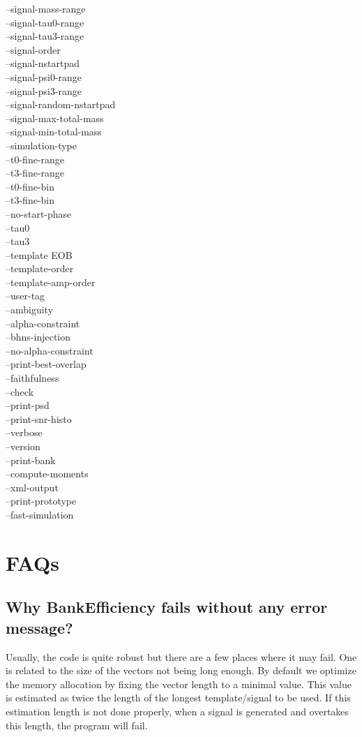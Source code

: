 \documentclass[a4paper,10pt]{article}
\begin{document}
--signal-mass-range\\
--signal-tau0-range\\
--signal-tau3-range\\
--signal-order\\
--signal-nstartpad\\
--signal-psi0-range\\
--signal-psi3-range\\
--signal-random-nstartpad\\
--signal-max-total-mass\\
--signal-min-total-mass\\
--simulation-type\\
--t0-fine-range\\
--t3-fine-range\\
--t0-fine-bin\\
--t3-fine-bin\\
--no-start-phase\\
--tau0\\
--tau3\\
--template EOB\\
--template-order\\
--template-amp-order\\
--user-tag\\
--ambiguity\\
--alpha-constraint\\
--bhns-injection\\
--no-alpha-constraint\\
--print-best-overlap\\
--faithfulness\\
--check\\
--print-psd\\
--print-snr-histo\\
--verbose\\
--version\\
--print-bank\\
--compute-moments\\
--xml-output\\
--print-prototype\\
--fast-simulation\\

\section{FAQs}\label{faqs}
\subsection{Why BankEfficiency fails without any error message? }
Usually, the code is quite robust but there are a few places where it may fail. One is related to the size of the vectors not being long enough. By default we optimize the memory allocation by fixing the vector length to a minimal value. This value is estimated as twice the length of the longest template/signal to be used. If this estimation length is not done properly, when a signal is generated and overtakes this length, the program will fail.
\end{document}
